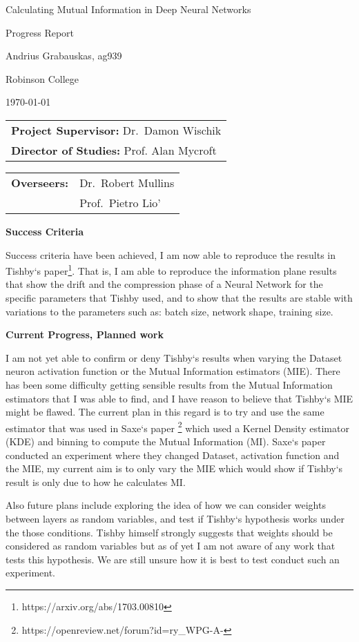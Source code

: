 \documentclass[11pt]{article}
\begin{document}
\thispagestyle{empty}

\centerline{\large Calculating Mutual Information in Deep Neural Networks}
\centerline{\large Progress Report}
\vspace{0.2in}

\centerline{Andrius Grabauskas, ag939}
\centerline{Robinson College}
\centerline{\today}

\vspace{0.2in}


\begin{tabular}[t]{@{}l}
{\bf Project Supervisor:} Dr.\ Damon Wischik \\[3mm]
{\bf Director of Studies:} Prof. Alan Mycroft
\end{tabular}
\hfill
\begin{tabular}[t]{@{}l @{}l}
{\bf Overseers: } & Dr.\ Robert Mullins \\[3mm] 
& Prof.\ Pietro Lio'
\end{tabular}

\vspace{0.3in}

\large{\bf Success Criteria}

  Success criteria have been achieved, I am now able to reproduce the results in
  Tishby`s paper\footnote{https://arxiv.org/abs/1703.00810}. That is, I am able
  to reproduce the information plane results that show the drift and the
  compression phase of a Neural Network for the specific parameters that Tishby
  used, and to show that the results are stable with variations to the parameters
  such as: batch size, network shape, training size. 

\large{\bf Current Progress, Planned work}

  I am not yet able to confirm or deny Tishby`s results when varying the Dataset
  neuron activation function or the Mutual Information estimators (MIE).
  There has been some difficulty getting sensible results from the Mutual
  Information estimators that I was able to find, and I have reason to believe
  that Tishby`s MIE might be flawed. The current plan in this regard is to try
  and use the same estimator that was used in Saxe`s paper
  \footnote{https://openreview.net/forum?id=ry\_WPG-A-} which used a Kernel
  Density estimator (KDE) and binning to compute the Mutual Information (MI). 
  Saxe`s paper conducted an experiment where they changed Dataset, activation
  function and the MIE, my current aim is to only vary the MIE which would show
  if Tishby`s result is only due to how he calculates MI.

  Also future plans include exploring the idea of how we can consider weights
  between layers as random variables, and test if Tishby`s hypothesis works
  under the those conditions. Tishby himself strongly suggests that weights
  should be considered as random variables but as of yet I am not aware of any
  work that tests this hypothesis. We are still unsure how it is best to test
  conduct such an experiment.
\end{document}
